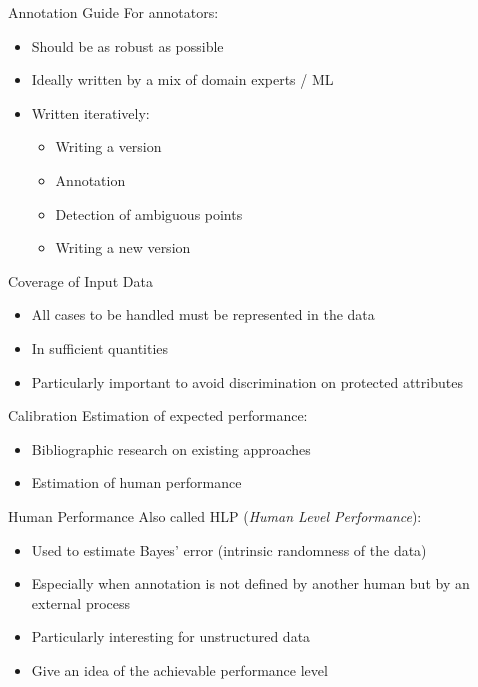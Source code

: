 \begin{frame}{Annotation Guide}
  For annotators:
  \begin{itemize}
    \item Should be as robust as possible
    \item Ideally written by a mix of domain experts / ML
    \item Written iteratively:
      \begin{itemize}
        \item Writing a version
        \item Annotation
        \item Detection of ambiguous points
        \item Writing a new version
      \end{itemize}
  \end{itemize}
\end{frame}

\begin{frame}{Coverage of Input Data}
  \begin{itemize}
    \item All cases to be handled must be represented in the data
    \item In sufficient quantities
    \item Particularly important to avoid discrimination on protected attributes
  \end{itemize}
\end{frame}

\begin{frame}{Calibration}
  Estimation of expected performance:
  \begin{itemize}
    \item Bibliographic research on existing approaches
    \item Estimation of human performance
  \end{itemize}
\end{frame}

\begin{frame}{Human Performance}
  Also called HLP (\textit{Human Level Performance}):
  \begin{itemize}
    \item Used to estimate Bayes' error (intrinsic randomness of the data)
    \item Especially when annotation is not defined by another human but by an external process
    \item Particularly interesting for unstructured data
    \item Give an idea of the achievable performance level
  \end{itemize}
\end{frame}

